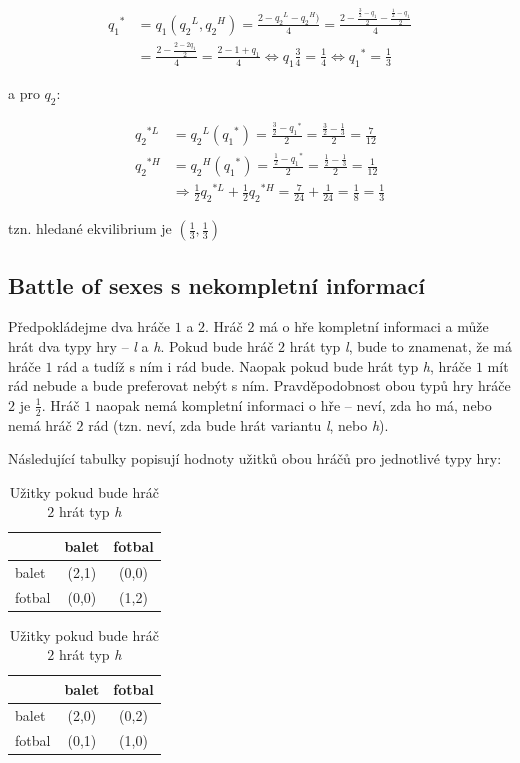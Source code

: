 \documentclass[12pt,a4paper,titlepage,final]{article}
\begin{document}
\begin{align*}
{q_1}^* &= q_1({q_2}^L, {q_2}^H) = \frac{2 - {q_2}^L - {q_2}^H)}{4} = \frac{2 - \frac{\frac{3}{2} - q_1}{2} - \frac{\frac{1}{2} - q_1}{2}}{4} \\
&= \frac{2 - \frac{2 - 2q_1}{2}}{4} = \frac{2 - 1 + q_1}{4} \Leftrightarrow q_1\frac{3}{4} = \frac{1}{4} \Leftrightarrow {q_1}^* = \frac{1}{3}
\end{align*}

a pro $q_2$:

\begin{align*}
{q_2}^{*L} &= {q_2}^L({q_1}^*) = \frac{\frac{3}{2} - {q_1}^*}{2} = \frac{\frac{3}{2} - \frac{1}{3}}{2} = \frac{7}{12} \\
{q_2}^{*H} &= {q_2}^H({q_1}^*) = \frac{\frac{1}{2} - {q_1}^*}{2} = \frac{\frac{1}{2} - \frac{1}{3}}{2} = \frac{1}{12} \\
 &\Rightarrow \frac{1}{2}{q_2}^{*L} + \frac{1}{2}{q_2}^{*H} = \frac{7}{24} + \frac{1}{24} = \frac{1}{8} = \frac{1}{3}
\end{align*}

tzn. hledané ekvilibrium je $(\frac{1}{3}, \frac{1}{3})$

\subsection{Battle of sexes s nekompletní informací}
Předpokládejme dva hráče $1$ a $2$.
Hráč $2$ má o hře kompletní informaci a může hrát dva typy hry -- \emph{l} a \emph{h}.
Pokud bude hráč $2$ hrát typ \emph{l}, bude to znamenat, že má hráče $1$ rád a tudíž s ním i rád bude.
Naopak pokud bude hrát typ \emph{h}, hráče $1$ mít rád nebude a bude preferovat nebýt s ním.
Pravděpodobnost obou typů hry hráče $2$ je $\frac{1}{2}$.
Hráč $1$ naopak nemá kompletní informaci o hře -- neví, zda ho má, nebo nemá hráč $2$ rád (tzn. neví, zda bude hrát variantu \emph{l}, nebo \emph{h}).

Následující tabulky popisují hodnoty užitků obou hráčů pro jednotlivé typy hry:

\begin{table}[h]
	\parbox{.45\linewidth}{
	\centering
	\begin{tabular}{|l|c|c|}
  		\hline                        
  			 	   & balet & fotbal \\
  		\hline                       
  			balet  & (2,1) & (0,0)  \\
  		\hline                       
  			fotbal & (0,0) & (1,2)  \\
  		\hline  
	\end{tabular}
	\caption{U2žitky pokud bude hráč $2$ hrát typ \emph{l}}
	}
\hfill
	\parbox{.45\linewidth}{
	\centering
	\begin{tabular}{|l|c|c|}
  		\hline                        
  	 			   & balet & fotbal \\
  		\hline                       
  			balet  & (2,0) & (0,2)  \\
  		\hline                       
  			fotbal & (0,1) & (1,0)  \\
  		\hline  
	\end{tabular}
	\caption{Užitky pokud bude hráč $2$ hrát typ \emph{h}}
}
\end{table}
\end{document}
